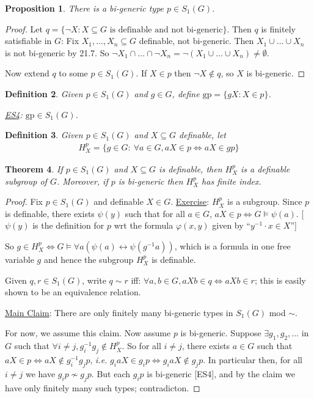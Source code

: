 \documentclass[]{article}
\theoremstyle{custhm}
\newtheorem{theorem}{Theorem}[section]
\theoremstyle{cusdef}
\newtheorem{defin}[theorem]{Definition}
\theoremstyle{custhm}
\theoremstyle{custhm}
\theoremstyle{custhm}
\newtheorem{prop}[theorem]{Proposition}
\theoremstyle{ex}
\theoremstyle{custhm}
\theoremstyle{cusdef}
\theoremstyle{remark}
\theoremstyle{remark}
\theoremstyle{numremark}
\renewcommand{\it}[1]{\textit{#1}}
\renewcommand{\phi}{\varphi}
\newcommand{\gp}{\textrm{gp}}
\begin{document}
\begin{prop}
	There is a bi-generic type $p \in S_1(G)$.
\end{prop}
\begin{proof}
	Let $q = \{\neg X:X\subseteq G\textrm{ is definable and not bi-generic}\}$. Then $q$ is finitely satisfiable in $G$: Fix $X_1,\dots,X_n\subseteq G$ definable, not bi-generic. Then $X_1\cup \dots\cup X_n$ is not bi-generic by 21.7. So $\neg X_1\cap\dots\cap \neg X_n = \neg(X_1\cup\dots\cup X_n)\ne \emptyset$.

	Now extend $q$ to some $p\in S_1(G)$. If $X\in p$ then $\neg X\not\in q$, so $X$ is bi-generic.
\end{proof}

\begin{defin}
	Given $p \in S_1(G)$ and $g \in G$, define $\gp = \{gX:X \in p\}$.

	\underline{ES4}: $\gp \in S_1(G)$.
\end{defin}

\begin{defin}
	Given $p \in S_1(G)$ and $X\subseteq G$ definable, let
	\begin{align*}
		H^p_X = \{g \in G :\ \forall a \in G, aX\in p \iff aX \in gp\}
	\end{align*}
\end{defin}
\begin{theorem}
	If $p \in S_1(G)$ and $X\subseteq G$ is definable, then $H^p_X$ is a definable subgroup of $G$. Moreover, if $p$ is bi-generic then $H^p_X$ has finite index.
\end{theorem}
\begin{proof}
	Fix $p \in S_1(G)$ and definable $X \in G$. \underline{Exercise}: $H^p_X$ is a subgroup. Since $p$ is definable, there exists $\psi(y)$ such that for all $a \in G$, $aX \in p\iff G\models \psi(a)$. [$\psi(y)$ is the definition for $p$ wrt the formula $\phi(x,y)$ given by ``$y^{-1}\cdot x \in X$'']

	So $g \in H^p_X\iff G \models \forall a(\psi(a)\leftrightarrow \psi(g^{-1}a))$, which is a formula in one free variable $g$ and hence the subgroup $H^p_X$ is definable.

	Given $q,r\in S_1(G)$, write $q\sim r$ iff: $\forall a,b\in G, aXb \in q \iff aXb \in r$; this is easily shown to be an equivalence relation.

	\underline{Main Claim}: There are only finitely many bi-generic types in $S_1(G)$ mod $\sim$.
	
	For now, we assume this claim. Now assume $p$ is bi-generic. Suppose $\exists g_1,g_2,\dots$ in $G$ such that $\forall i\ne j,g_i^{-1}g_j\not\in H^p_X$. So for all $i\ne j$, there exists $a \in G$ such that $aX \in p\iff aX\not\in g_i^{-1}g_jp$, \it{i.e.} $g_iaX\in g_ip \iff g_iaX\not\in g_jp$. In particular then, for all $i\ne j$ we have $g_ip \not\sim g_jp$. But each $g_ip$ is bi-generic [ES4], and by the claim we have only finitely many such types; contradicton.
\end{proof}
\end{document}
